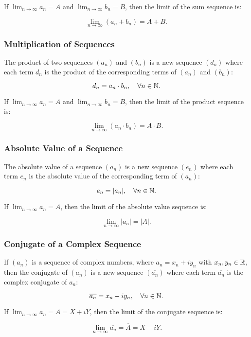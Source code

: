 If \(\lim_{n \to \infty} a_n = A\) and \(\lim_{n \to \infty} b_n = B\), then the limit of the sum sequence is:

\[
    \lim_{n \to \infty} (a_n + b_n) = A + B.
\]

\subsubsection{Multiplication of Sequences}

The product of two sequences \((a_n)\) and \((b_n)\) is a new sequence \((d_n)\) where each term \(d_n\) 
is the product of the corresponding terms of \((a_n)\) and \((b_n)\):

\[
    d_n = a_n \cdot b_n, \quad \forall n \in \mathbb{N}.
\]

If \(\lim_{n \to \infty} a_n = A\) and \(\lim_{n \to \infty} b_n = B\), then the limit of the product sequence is:

\[
    \lim_{n \to \infty} (a_n \cdot b_n) = A \cdot B.
\]

\subsubsection{Absolute Value of a Sequence}

The absolute value of a sequence \((a_n)\) is a new sequence \((e_n)\) where each term \(e_n\) is the absolute value of the corresponding term of \((a_n)\):

\[
    e_n = |a_n|, \quad \forall n \in \mathbb{N}.
\]

If \(\lim_{n \to \infty} a_n = A\), then the limit of the absolute value sequence is:

\[
    \lim_{n \to \infty} |a_n| = |A|.
\]

\subsubsection{Conjugate of a Complex Sequence}

If \((a_n)\) is a sequence of complex numbers, where \(a_n = x_n + i y_n\) with \(x_n, y_n \in \mathbb{R}\), then the conjugate of \((a_n)\) is a new sequence \((\overline{a_n})\) where each term \(\overline{a_n}\) is the complex conjugate of \(a_n\):

\[
    \overline{a_n} = x_n - i y_n, \quad \forall n \in \mathbb{N}.
\]

If \(\lim_{n \to \infty} a_n = A = X + i Y\), then the limit of the conjugate sequence is:

\[
    \lim_{n \to \infty} \overline{a_n} = \overline{A} = X - i Y.
\]

